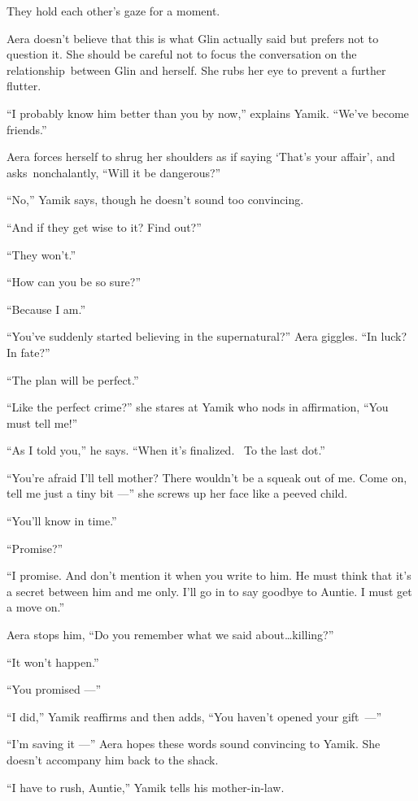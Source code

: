 \documentclass[twoside,11pt]{book}
\begin{document}
They hold each other's gaze for a moment.

Aera doesn't believe that this is what Glin actually said but prefers not to question it. She should be careful not to
focus the conversation on the relationship~between Glin and herself. She rubs her eye to prevent a further flutter.

``I probably know him better than you by now,'' explains Yamik. ``We've become
friends.''

Aera forces herself to shrug her shoulders as if saying `That's your affair', and asks~nonchalantly, ``Will
it be dangerous?''

``No,'' Yamik says, though he doesn't sound too convincing.

``And if they get wise{ }to it? Find out?''

``They won't.''

``How can you be so sure?''

``Because I am.''

``You've suddenly started believing in the supernatural?'' Aera giggles. ``In
luck? In fate?''

``The plan will be perfect.''

``Like the perfect crime?'' she stares at Yamik who nods in affirmation, ``You must tell me!''


``As I told you,'' he says. ``When it's finalized.~ To the last dot.''

``You're afraid I'll tell mother? There wouldn't be a squeak out of me. Come on, tell me just a tiny bit ---'' she screws up her face like a peeved child.

``You'll know in time.''

``Promise?''

``I promise. And don't mention it when you write to him. He must think that it's a secret between him and
me only. I'll go in to say goodbye to Auntie. I must get a move on.''

Aera stops him, ``Do you remember what we said about{\ldots}killing?''

``It won't happen.''

``You promised ---''

``I did,'' Yamik reaffirms and then adds, ``You haven't opened your gift~---''

``I'm saving it ---'' Aera hopes these words sound convincing to Yamik. She doesn't accompany
him back to the shack.

``I have to rush, Auntie,'' Yamik tells his mother-in-law.
\end{document}
